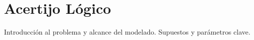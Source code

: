 
\section{Acertijo Lógico}\label{sec:04-acertijo-logico}
Introducción al problema y alcance del modelado.
Supuestos y parámetros clave.
